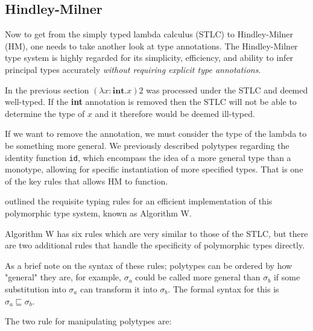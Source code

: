 \documentclass{l4proj}
\begin{document}
\subsection{Hindley-Milner}
\label{sec:hindley-milner}



Now to get from the simply typed lambda calculus (STLC) to Hindley-Milner (HM), one needs to take another look at type annotations.
The Hindley-Milner type system is highly regarded for its simplicity, efficiency, and ability to infer principal types accurately \emph{without requiring explicit type annotations}.

In the previous section $(\lambda x:\textbf{int}. x) 2$ was processed under the STLC and deemed well-typed.
If the \textbf{int} annotation is removed then the STLC will not be able to determine the type of $x$ and it therefore would be deemed ill-typed.

If we want to remove the annotation, we must consider the type of the lambda to be something more general.
We previously described polytypes regarding the identity function \texttt{id}, which encompass the idea of a more general type than a monotype, allowing for specific instantiation of more specified types.
That is one of the key rules that allows HM to function.

\citet{Milner_1978} outlined the requisite typing rules for an efficient implementation of this polymorphic type system, known as Algorithm W.

Algorithm W has six rules which are very similar to those of the STLC, but there are two additional rules that handle the specificity of polymorphic types directly.

As a brief note on the syntax of these rules; polytypes can be ordered by how "general" they are, for example, $\sigma_a$ could be called more general than $\sigma_b$ if some substitution into $\sigma_a$ can transform it into $\sigma_b$.
The formal syntax for this is $\sigma_a \sqsubseteq \sigma_b$.

The two rule for manipulating polytypes are:
\end{document}
